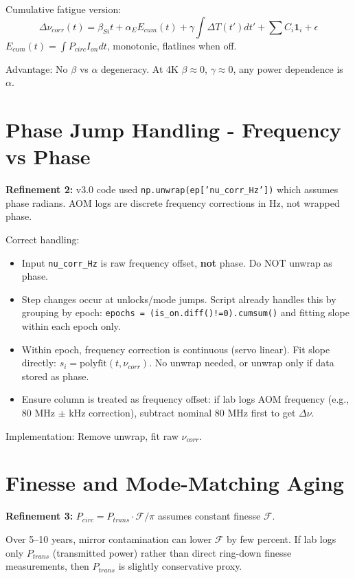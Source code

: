 \documentclass[11pt,a4paper]{article}
\begin{document}
Cumulative fatigue version:
\begin{equation}
\Delta \nu_{corr}(t) = \beta_{Si} t + \alpha_E E_{cum}(t) + \gamma \int \Delta T(t') dt' + \sum C_i \mathbf{1}_i + \epsilon
\end{equation}
$E_{cum}(t)=\int P_{circ} I_{on} dt$, monotonic, flatlines when off.

Advantage: No $\beta$ vs $\alpha$ degeneracy. At 4K $\beta\approx0$, $\gamma\approx0$, any power dependence is $\alpha$.

\section{Phase Jump Handling - Frequency vs Phase}

\textbf{Refinement 2:} v3.0 code used \texttt{np.unwrap(ep['nu\_corr\_Hz'])} which assumes phase radians. AOM logs are discrete frequency corrections in Hz, not wrapped phase.

Correct handling:

\begin{itemize}
\item Input \texttt{nu\_corr\_Hz} is raw frequency offset, \textbf{not} phase. Do NOT unwrap as phase.
\item Step changes occur at unlocks/mode jumps. Script already handles this by grouping by epoch: \texttt{epochs = (is\_on.diff()!=0).cumsum()} and fitting slope within each epoch only.
\item Within epoch, frequency correction is continuous (servo linear). Fit slope directly: $s_i = \text{polyfit}(t, \nu_{corr})$. No unwrap needed, or unwrap only if data stored as phase.
\item Ensure column is treated as frequency offset: if lab logs AOM frequency (e.g., 80 MHz $\pm$ kHz correction), subtract nominal 80 MHz first to get $\Delta\nu$.
\end{itemize}

Implementation: Remove unwrap, fit raw $\nu_{corr}$.

\section{Finesse and Mode-Matching Aging}

\textbf{Refinement 3:} $P_{circ}=P_{trans}\cdot\mathcal{F}/\pi$ assumes constant finesse $\mathcal{F}$.

Over 5--10 years, mirror contamination can lower $\mathcal{F}$ by few percent. If lab logs only $P_{trans}$ (transmitted power) rather than direct ring-down finesse measurements, then $P_{trans}$ is slightly conservative proxy.
\end{document}
